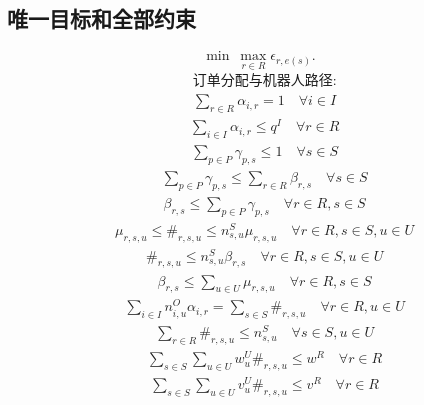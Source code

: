 \documentclass[UTF8,11pt]{ctexart}
\begin{document}
\subsection*{唯一目标和全部约束}
\[\min\ \max_{r\in R}\epsilon_{r,e(s)}.\tag{4.1}\]
\[\begin{aligned}&\text{订单分配与机器人路径:}\end{aligned}\]
\[\begin{aligned}& \sum_{r \in R} \alpha_{i, r} = 1 \quad \forall i \in I\end{aligned}\]
\[\begin{aligned}& \sum_{i \in I} \alpha_{i, r} \le q^I \quad \forall r \in R\end{aligned}\]
\[\begin{aligned}& \sum_{p \in P} \gamma_{p, s} \le 1 \quad \forall s \in S\end{aligned}\]
\[\begin{aligned}& \sum_{p \in P} \gamma_{p, s} \le \sum_{r \in R} \beta_{r, s} \quad \forall s \in S\end{aligned}\]
\[\begin{aligned}& \beta_{r, s} \le \sum_{p \in P} \gamma_{p, s} \quad \forall r \in R, s \in S\end{aligned}\]
\[\begin{aligned}& \mu_{r, s, u} \le \#_{r, s, u} \le n^S_{s, u} \mu_{r, s, u} \quad \forall r \in R, s \in S, u \in U\end{aligned}\]
\[\begin{aligned}& \#_{r, s, u} \le n^S_{s, u} \beta_{r, s} \quad \forall r \in R, s \in S, u \in U\end{aligned}\]
\[\begin{aligned}& \beta_{r, s} \le \sum_{u \in U} \mu_{r, s, u} \quad \forall r \in R, s \in S\end{aligned}\]
\[\begin{aligned}& \sum_{i \in I} n^O_{i, u} \alpha_{i, r} = \sum_{s \in S} \#_{r, s, u} \quad \forall r \in R, u \in U\end{aligned}\]
\[\begin{aligned}& \sum_{r \in R} \#_{r, s, u} \le n^S_{s, u} \quad \forall s \in S, u \in U\end{aligned}\]
\[\begin{aligned}& \sum_{s \in S} \sum_{u \in U} w^U_u \#_{r, s, u} \le w^R \quad \forall r \in R\end{aligned}\]
\[\begin{aligned}& \sum_{s \in S} \sum_{u \in U} v^U_u \#_{r, s, u} \le v^R \quad \forall r \in R\end{aligned}\]
\end{document}
